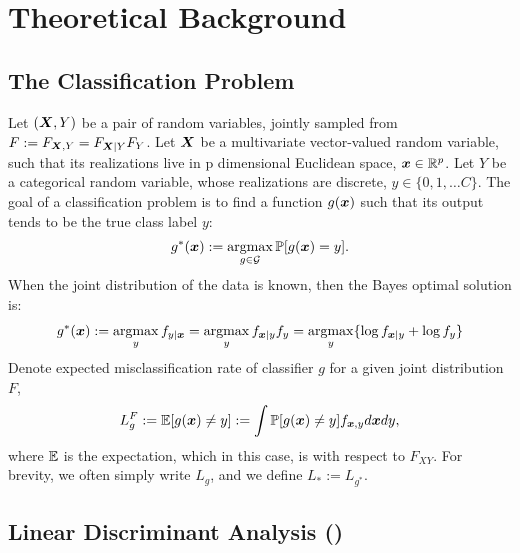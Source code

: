 \documentclass[10pt]{article}
\begin{document}
\clearpage
\appendix
\section{Theoretical Background}


\subsection{The Classification Problem}

Let $(\boldsymbol{X},Y)$ be a pair of random variables, jointly sampled from $F :=F_{\boldsymbol{X},Y}=F_{\boldsymbol{X}|Y}F_{Y}$.  
Let $\boldsymbol{X}$ be a multivariate vector-valued random variable, such that its realizations live in p dimensional Euclidean space, $\boldsymbol{x} \in \mathbb{R}^p$.  Let $Y$ be a categorical random variable, whose realizations are discrete,  $y \in \{0,1,\ldots C\}$.  The goal of a classification problem is to find a function $g(\boldsymbol{x})$ such that its output tends to be the true class label $y$:
\begin{align*} %
g^*(\bx) := \argmax_{g \in \mc{G}} \PP[g(\bx) = y].
\end{align*}
When the joint distribution of the data is known, then the Bayes optimal solution is:
\begin{align}  \label{eq:R}
g^*(\bx) := \argmax_y f_{y|\bx} = \argmax_y f_{\bx|y}f_y =\argmax_y \{\log f_{\bx|y} + \log f_y \}
\end{align}
Denote expected misclassification rate of classifier $g$ for a given joint distribution $F$, 
\begin{align*}
L^F_g := \mathbb{E}[g(\boldsymbol{x}) \neq y] := \int \mathbb{P}[g(\boldsymbol{x}) \neq y] f_{\boldsymbol{x},y} d\boldsymbol{x} dy,
\end{align*}
where $\mathbb{E}$ is the expectation, which in this case, is with respect to $F_{XY}$.
For brevity, we often simply write $L_g$, and we define $L_* := L_{g^*}$.  


\subsection{Linear Discriminant Analysis (\Lda)}
\end{document}
